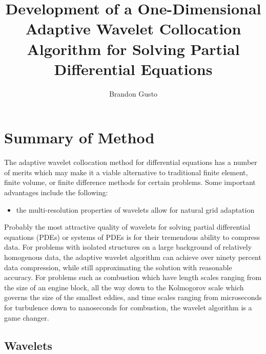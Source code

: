 \documentclass[11pt]{article}
\begin{document}
\title{Development of a One-Dimensional Adaptive Wavelet Collocation Algorithm for Solving Partial Differential Equations}
\author{Brandon Gusto \\}

\maketitle
%
\section{Summary of Method}
The adaptive wavelet collocation method for differential equations has a number of merits which may make it a viable
alternative to traditional finite element, finite volume, or finite difference methods for certain problems. 
Some important advantages include the following:
\begin{itemize}
    \item the multi-resolution properties of wavelets allow for natural grid adaptation
\end{itemize} 
Probably the most attractive quality of wavelets for solving partial differential equations (PDEs) or systems of PDEs is for their
tremendous ability to compress data. For problems with isolated structures on a large background of relatively 
homogenous data, the adaptive wavelet algorithm can achieve over ninety percent data compression, while still approximating the solution with reasonable accuracy. For problems such as combustion which have length scales ranging from the size of an engine block, all the way down to the Kolmogorov scale which governs the size of the smallest eddies, and time scales ranging from microseconds for turbulence down to nanoseconds for combustion, the wavelet algorithm is a game changer.

\subsection{Wavelets}
\end{document}
